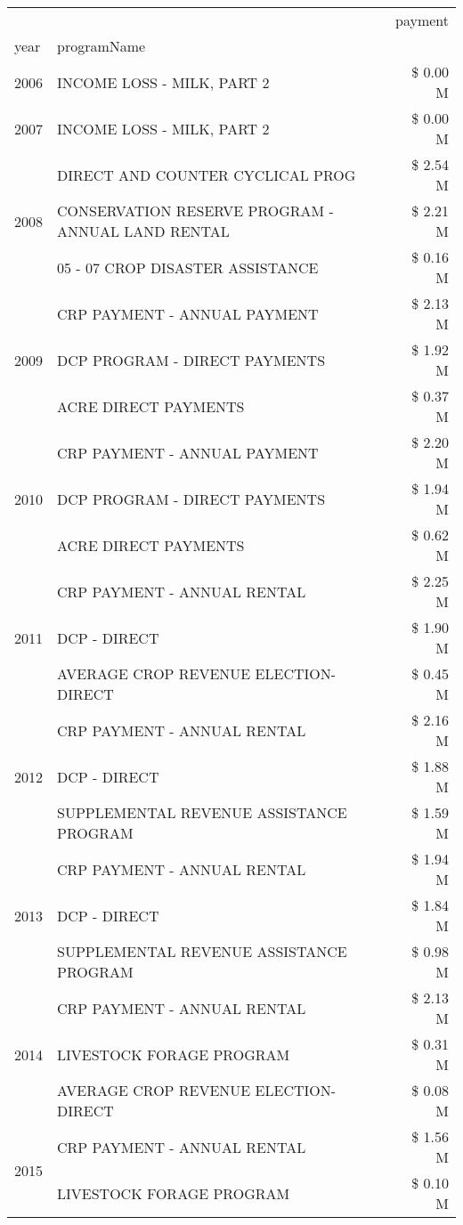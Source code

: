\begin{tabular}{llr}
\toprule
 &  & payment \\
year & programName &  \\
\midrule
2006 & INCOME LOSS - MILK, PART 2 & \$ 0.00 M \\
\cline{1-3}
2007 & INCOME LOSS - MILK, PART 2 & \$ 0.00 M \\
\cline{1-3}
\multirow[t]{3}{*}{2008} & DIRECT AND COUNTER CYCLICAL PROG & \$ 2.54 M \\
 & CONSERVATION RESERVE PROGRAM - ANNUAL LAND RENTAL & \$ 2.21 M \\
 & 05 - 07 CROP DISASTER ASSISTANCE & \$ 0.16 M \\
\cline{1-3}
\multirow[t]{3}{*}{2009} & CRP PAYMENT - ANNUAL PAYMENT & \$ 2.13 M \\
 & DCP PROGRAM - DIRECT PAYMENTS & \$ 1.92 M \\
 & ACRE DIRECT PAYMENTS & \$ 0.37 M \\
\cline{1-3}
\multirow[t]{3}{*}{2010} & CRP PAYMENT - ANNUAL PAYMENT & \$ 2.20 M \\
 & DCP PROGRAM - DIRECT PAYMENTS & \$ 1.94 M \\
 & ACRE DIRECT PAYMENTS & \$ 0.62 M \\
\cline{1-3}
\multirow[t]{3}{*}{2011} & CRP PAYMENT - ANNUAL RENTAL & \$ 2.25 M \\
 & DCP - DIRECT & \$ 1.90 M \\
 & AVERAGE CROP REVENUE ELECTION-DIRECT & \$ 0.45 M \\
\cline{1-3}
\multirow[t]{3}{*}{2012} & CRP PAYMENT - ANNUAL RENTAL & \$ 2.16 M \\
 & DCP - DIRECT & \$ 1.88 M \\
 & SUPPLEMENTAL REVENUE ASSISTANCE PROGRAM & \$ 1.59 M \\
\cline{1-3}
\multirow[t]{3}{*}{2013} & CRP PAYMENT - ANNUAL RENTAL & \$ 1.94 M \\
 & DCP - DIRECT & \$ 1.84 M \\
 & SUPPLEMENTAL REVENUE ASSISTANCE PROGRAM & \$ 0.98 M \\
\cline{1-3}
\multirow[t]{3}{*}{2014} & CRP PAYMENT - ANNUAL RENTAL & \$ 2.13 M \\
 & LIVESTOCK FORAGE PROGRAM & \$ 0.31 M \\
 & AVERAGE CROP REVENUE ELECTION-DIRECT & \$ 0.08 M \\
\cline{1-3}
\multirow[t]{3}{*}{2015} & CRP PAYMENT - ANNUAL RENTAL & \$ 1.56 M \\
 & LIVESTOCK FORAGE PROGRAM & \$ 0.10 M \\

\end{tabular}
